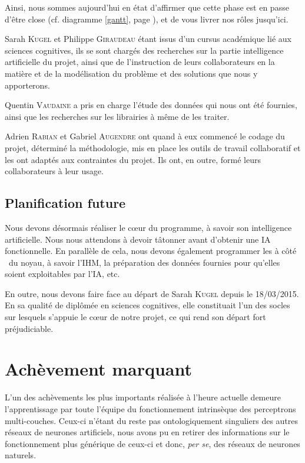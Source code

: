 \documentclass[a4paper, 12pt]{article}
\begin{document}
Ainsi, nous sommes aujourd'hui en état d'affirmer que cette phase est en passe d'être close (cf. diagramme \ref{gantt}, page \pageref{gantt}), et de vous livrer nos rôles jusqu'ici.

Sarah \textsc{Kugel} et Philippe \textsc{Giraudeau} étant issus d'un cursus académique lié aux sciences cognitives, ils se sont chargés des recherches sur la partie intelligence artificielle du projet, ainsi que de l'instruction de leurs collaborateurs en la matière et de la modélisation du problème et des solutions que nous y apporterons.

Quentin \textsc{Vaudaine} a pris en charge l'étude des données qui nous ont été fournies, ainsi que les recherches sur les librairies à même de les traiter.

Adrien \textsc{Rabian} et Gabriel \textsc{Augendre} ont quand à eux commencé le codage du projet, déterminé la méthodologie, mis en place les outils de travail collaboratif et les ont adaptés aux contraintes du projet. Ils ont, en outre, formé leurs collaborateurs à leur usage.

\subsection{Planification future}
Nous devons désormais réaliser le cœur du programme, à savoir son intelligence artificielle. Nous nous attendons à devoir tâtonner avant d'obtenir une IA fonctionnelle. En parallèle de cela, nous devons également programmer les \og à côté \fg~du noyau, à savoir l'IHM, la préparation des données fournies pour qu'elles soient exploitables par l'IA, etc.

En outre, nous devons faire face au départ de Sarah \textsc{Kugel} depuis le 18/03/2015. En sa qualité de diplômée en sciences cognitives, elle constituait l'un des socles sur lesquels s'appuie le cœur de notre projet, ce qui rend son départ fort préjudiciable.

\section{Achèvement marquant}
L'un des achèvements les plus importants réalisée à l'heure actuelle demeure l'apprentissage par toute l'équipe du fonctionnement intrinsèque des perceptrons multi-couches. Ceux-ci n'étant du reste pas ontologiquement singuliers des autres réseaux de neurones artificiels, nous avons pu en retirer des informations sur le fonctionnement plus générique de ceux-ci et donc, \textit{per se}, des réseaux de neurones naturels.
\end{document}
